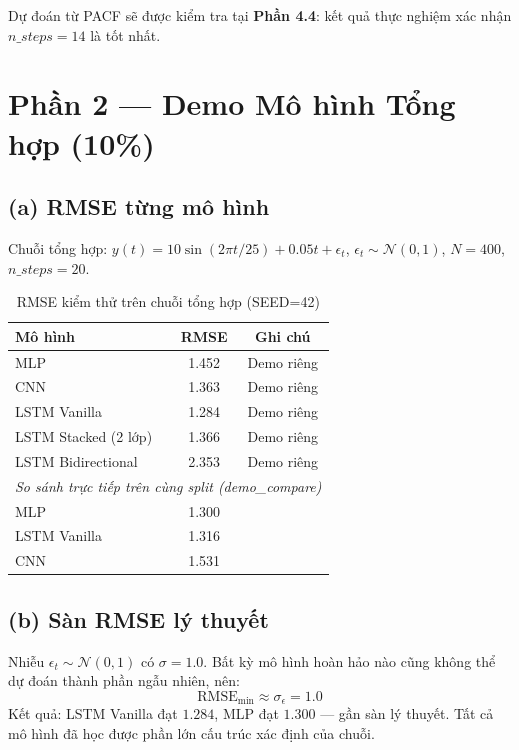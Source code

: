 \documentclass[12pt,a4paper]{article}
\begin{document}
Dự đoán từ PACF sẽ được kiểm tra tại \textbf{Phần 4.4}: kết quả thực nghiệm xác nhận $n\_steps = 14$ là tốt nhất.

\section{Phần 2 --- Demo Mô hình Tổng hợp (10\%)}

\subsection{(a) RMSE từng mô hình}

Chuỗi tổng hợp: $y(t) = 10\sin(2\pi t/25) + 0.05t + \epsilon_t$, $\epsilon_t \sim \mathcal{N}(0,1)$, $N=400$, $n\_steps=20$.

\begin{table}[H]
\centering
\caption{RMSE kiểm thử trên chuỗi tổng hợp (SEED=42)}
\begin{tabular}{lcc}
\toprule
\textbf{Mô hình} & \textbf{RMSE} & \textbf{Ghi chú} \\
\midrule
MLP                   & 1.452 & Demo riêng \\
CNN                   & 1.363 & Demo riêng \\
LSTM Vanilla          & 1.284 & Demo riêng \\
LSTM Stacked (2 lớp)  & 1.366 & Demo riêng \\
LSTM Bidirectional    & 2.353 & Demo riêng \\
\midrule
\multicolumn{3}{c}{\textit{So sánh trực tiếp trên cùng split (demo\_compare)}} \\
\midrule
MLP         & 1.300 & \\
LSTM Vanilla& 1.316 & \\
CNN         & 1.531 & \\
\bottomrule
\end{tabular}
\end{table}

\subsection{(b) Sàn RMSE lý thuyết}

Nhiễu $\epsilon_t \sim \mathcal{N}(0, 1)$ có $\sigma = 1.0$. Bất kỳ mô hình hoàn hảo nào cũng không thể dự đoán thành phần ngẫu nhiên, nên:
\[
\text{RMSE}_{\min} \approx \sigma_\epsilon = 1.0
\]
Kết quả: LSTM Vanilla đạt $1.284$, MLP đạt $1.300$ --- gần sàn lý thuyết. Tất cả mô hình đã học được phần lớn cấu trúc xác định của chuỗi.
\end{document}
